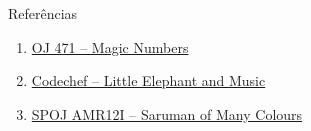\begin{frame}[fragile]{Referências}

    \begin{enumerate}
        \item \href{https://onlinejudge.org/index.php?option=com_onlinejudge&Itemid=8&category=24&page=show_problem&problem=412}{OJ 471 -- Magic Numbers} 

        \item \href{https://www.codechef.com/problems/LEMUSIC}{Codechef -- Little Elephant and Music}

        \item \href{https://www.spoj.com/problems/AMR12I/}{SPOJ AMR12I -- Saruman of Many Colours}
    \end{enumerate}

\end{frame}
